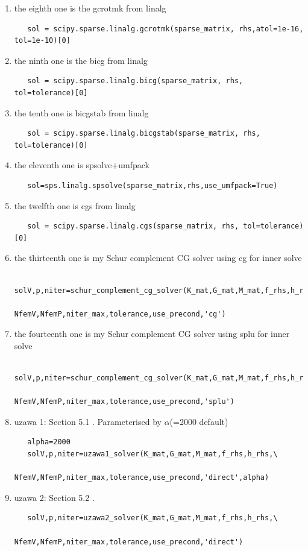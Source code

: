 \begin{enumerate}
\item the eighth one is the gcrotmk from linalg
\begin{lstlisting}
   sol = scipy.sparse.linalg.gcrotmk(sparse_matrix, rhs,atol=1e-16, tol=1e-10)[0]
\end{lstlisting}
\item the ninth one is the bicg from linalg
\begin{lstlisting}
   sol = scipy.sparse.linalg.bicg(sparse_matrix, rhs, tol=tolerance)[0]
\end{lstlisting}
\item the tenth one is bicgstab from linalg
\begin{lstlisting}
   sol = scipy.sparse.linalg.bicgstab(sparse_matrix, rhs, tol=tolerance)[0]
\end{lstlisting}
\item the eleventh one is spsolve+umfpack 
\begin{lstlisting}
   sol=sps.linalg.spsolve(sparse_matrix,rhs,use_umfpack=True)
\end{lstlisting}
\item the twelfth one is cgs from linalg
\begin{lstlisting}
   sol = scipy.sparse.linalg.cgs(sparse_matrix, rhs, tol=tolerance)[0]
\end{lstlisting}
\item the thirteenth one is my Schur complement CG solver using cg for inner solve
\begin{lstlisting}
   solV,p,niter=schur_complement_cg_solver(K_mat,G_mat,M_mat,f_rhs,h_rhs,\
                                           NfemV,NfemP,niter_max,tolerance,use_precond,'cg')
\end{lstlisting}
\item the fourteenth one is my Schur complement CG solver using splu for inner solve
\begin{lstlisting}
   solV,p,niter=schur_complement_cg_solver(K_mat,G_mat,M_mat,f_rhs,h_rhs,\
                                           NfemV,NfemP,niter_max,tolerance,use_precond,'splu')
\end{lstlisting}
\item uzawa 1: Section 5.1 \cite{braess}. Parameterised by $\alpha$(=2000 default)
\begin{lstlisting}
   alpha=2000
   solV,p,niter=uzawa1_solver(K_mat,G_mat,M_mat,f_rhs,h_rhs,\
                       NfemV,NfemP,niter_max,tolerance,use_precond,'direct',alpha)
\end{lstlisting}

\item uzawa 2: Section 5.2 \cite{braess}. 
\begin{lstlisting}
   solV,p,niter=uzawa2_solver(K_mat,G_mat,M_mat,f_rhs,h_rhs,\
                       NfemV,NfemP,niter_max,tolerance,use_precond,'direct')
\end{lstlisting}




\end{enumerate}


